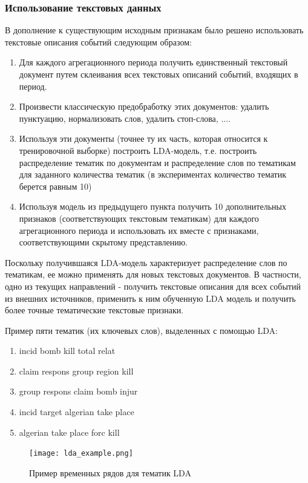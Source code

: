 \subsubsection{Использование текстовых данных} \label{lda_topics}
В дополнение к существующим исходным признакам было решено использовать текстовые описания событий следующим образом:
\begin{enumerate}
    \item Для каждого агрегационного периода получить единственный текстовый документ путем склеивания всех текстовых описаний событий, входящих в период.
    \item Произвести классическую предобработку этих документов: удалить пунктуацию, нормализовать слов, удалить стоп-слова, ....
    \item Используя эти документы (точнее ту их часть, которая относится к тренировочной выборке) построить LDA-модель, т.е. построить распределение тематик по документам и распределение слов по тематикам для заданного количества тематик (в экспериментах количество тематик берется равным 10)
    \item Используя модель из предыдущего пункта получить 10 дополнительных признаков (соответствующих текстовым тематикам) для каждого агрегационного периода и использовать их вместе с признаками, соответствующими скрытому представлению.
\end{enumerate}
Поскольку получившаяся LDA-модель характеризует распределение слов по тематикам, ее можно применять для новых текстовых документов.
В частности, одно из текущих направлений - получить текстовые описания для всех событий из внешних источников, применить к ним обученную LDA модель и получить более точные тематические текстовые признаки.

Пример пяти тематик (их ключевых слов), выделенных с помощью LDA:
\begin{enumerate}
    \item incid bomb kill total relat
    \item claim respons group region kill
    \item group respons claim bomb injur
    \item incid target algerian take place
    \item algerian take place forc kill
\end{enumerate}

\begin{figure}
  \texttt{[image: lda\_example.png]}
  \caption{Пример временных рядов для тематик LDA}
  \label{fig:lda_example}
\end{figure}


